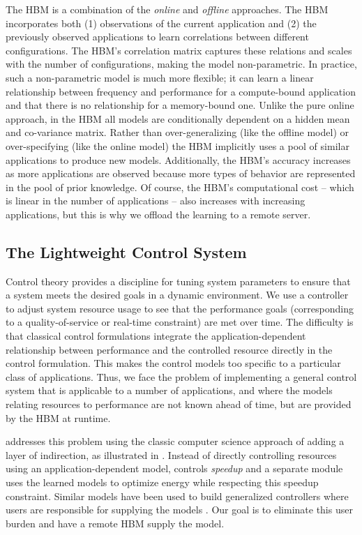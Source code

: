 The HBM is a combination of the \emph{online} and \emph{offline}
approaches. The HBM incorporates both (1) observations of the current
application and (2) the previously observed applications to learn
correlations between different configurations.  The HBM's correlation
matrix captures these relations and scales with the number of
configurations, making the model non-parametric.  In practice, such a
non-parametric model is much more flexible; \eg{} it can learn a
linear relationship between frequency and performance for a
compute-bound application and that there is no relationship for a
memory-bound one.  Unlike the pure online approach, in the HBM all
models are conditionally dependent on a hidden mean and co-variance
matrix.  Rather than over-generalizing (like the offline model) or
over-specifying (like the online model) the HBM implicitly uses a pool
of similar applications to produce new models. Additionally, the HBM's
accuracy increases as more applications are observed because more
types of behavior are represented in the pool of prior knowledge.  Of
course, the HBM's computational cost -- which is linear in the number
of applications -- also increases with increasing applications, but
this is why we offload the learning to a remote server.

\subsection{The Lightweight Control System}

Control theory provides a discipline for tuning system parameters to
ensure that a system meets the desired goals in a dynamic environment.
We use a controller to adjust system resource usage to see that the
performance goals (corresponding to a quality-of-service or real-time
constraint) are met over time.  The difficulty is that classical
control formulations integrate the application-dependent relationship
between performance and the controlled resource directly in the
control formulation. This makes the control models too specific to a
particular class of applications.  Thus, we face the problem of
implementing a general control system that is applicable to a number
of applications, and where the models relating resources to
performance are not known ahead of time, but are provided by the HBM
at runtime.

\SYSTEM{} addresses this problem using the classic computer science
approach of adding a layer of indirection, as illustrated in
.  Instead of directly controlling resources
using an application-dependent model, \SYSTEM{} controls
\emph{speedup} and a separate module uses the learned models to
optimize energy while respecting this speedup constraint.  Similar
models have been used to build generalized controllers where users are
responsible for supplying the models \cite{ControlWare,POET}.  Our
goal is to eliminate this user burden and have a remote HBM supply the
model.

